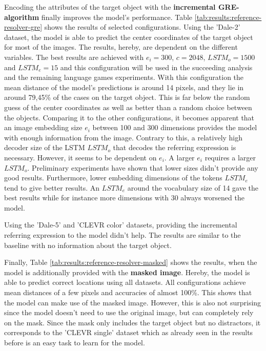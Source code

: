 Encoding the attributes of the target object with the \textbf{incremental GRE-algorithm} finally improves the model's performance.
Table \ref{tab:results:reference-resolver-gre} shows the results of selected configurations.
Using the 'Dale-2' dataset, the model is able to predict the center coordinates of the target object for most of the images.
The results, hereby, are dependent on the different variables.
The best results are achieved with $e_i=300$, $c=2048$, $LSTM_o=1500$ and $LSTM_e=15$ and this configuration will be used in the succeeding analysis and the remaining language games experiments.
With this configuration the mean distance of the model's predictions is around 14 pixels, and they lie in around 79,45\% of the cases on the target object.
This is far below the random guess of the center coordinates as well as better than a random choice between the objects.
Comparing it to the other configurations, it becomes apparent that an image embedding size $e_i$ between 100 and 300 dimensions provides the model with enough information from the image.
Contrary to this, a relatively high decoder size of the LSTM $LSTM_o$ that decodes the referring expression is necessary.
However, it seems to be dependent on $e_i$.
A larger $e_i$ requires a larger $LSTM_o$.
Preliminary experiments have shown that lower sizes didn't provide any good results.
Furthermore, lower embedding dimensions of the tokens $LSTM_e$ tend to give better results.
An $LSTM_e$ around the vocabulary size of 14 gave the best results while for instance more dimensions with 30 always worsened the model.

Using the 'Dale-5' and 'CLEVR color' datasets, providing the incremental referring expression to the model didn't help.
The results are similar to the baseline with no information about the target object.

Finally, Table \ref{tab:results:reference-resolver-masked} shows the results, when the model is additionally provided with the \textbf{masked image}.
Hereby, the model is able to predict correct locations using all datasets.
All configurations achieve mean distances of a few pixels and accuracies of almost 100\%.
This shows that the model can make use of the masked image.
However, this is also not surprising since the model doesn't need to use the original image, but can completely rely on the mask.
Since the mask only includes the target object but no distractors, it corresponds to the 'CLEVR single' dataset which as already seen in the results before is an easy task to learn for the model.

